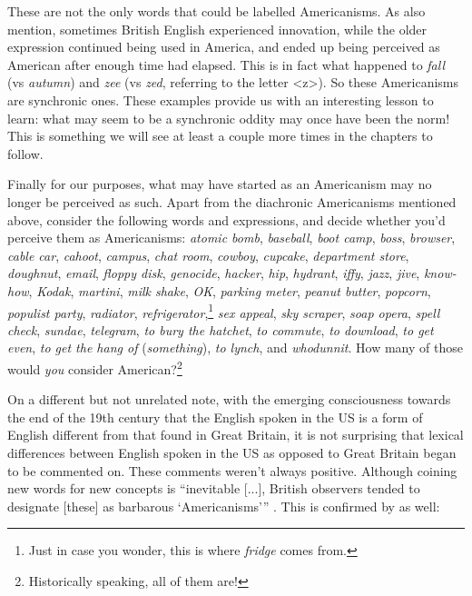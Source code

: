 These are not the only words that could be labelled Americanisms. As \citet{CassidyHall2001} also mention, sometimes British English experienced innovation, while the older expression continued being used in America, and ended up being perceived as American after enough time had elapsed. This is in fact what happened to \textit{fall} (vs \textit{autumn}) and \textit{zee} (vs \textit{zed}, referring to the letter <z>). So these Americanisms are synchronic ones. These examples provide us with an interesting lesson to learn: what may seem to be a synchronic oddity may once have been the norm! This is something we will see at least a couple more times in the chapters to follow. 

Finally for our purposes, what may have started as an Americanism may no longer be perceived as such. Apart from the diachronic Americanisms mentioned above, consider the following words and expressions, and decide whether you'd perceive them as Americanisms: \textit{atomic bomb}, \textit{baseball},  \textit{boot camp}, \textit{boss}, \textit{browser}, \textit{cable car}, \textit{cahoot}, \textit{campus}, \textit{chat room}, \textit{cowboy}, \textit{cupcake}, \textit{department store}, \textit{doughnut}, \textit{email}, \textit{floppy disk}, \textit{genocide}, \textit{hacker}, \textit{hip}, \textit{hydrant}, \textit{iffy}, \textit{jazz}, \textit{jive}, \textit{know-how}, \textit{Kodak}, \textit{martini}, \textit{milk shake}, \textit{OK}, \textit{parking meter}, \textit{peanut butter}, \textit{popcorn}, \textit{populist party}, \textit{radiator}, \textit{refrigerator},\footnote{Just in case you wonder, this is where \textit{fridge} comes from.} \textit{sex appeal}, \textit{sky scraper}, \textit{soap opera}, \textit{spell check}, \textit{sundae}, \textit{telegram}, \textit{to bury the hatchet}, \textit{to commute}, \textit{to download}, \textit{to get even}, \textit{to get the hang of} (\textit{something}), \textit{to lynch}, and \textit{whodunnit}. How many of those would \textit{you} consider American?\footnote{Historically speaking, all of them are!}

On a different but not unrelated note, with the emerging consciousness towards the end of the 19th century that the English spoken in the US is a form of English different from that found in Great Britain, it is not surprising that lexical differences between English spoken in the US as opposed to Great Britain began to be commented on. These comments weren't always positive. Although coining new words for new concepts is ``inevitable [...], British observers tended to designate [these] as barbarous `Americanisms'{''} \citep[68]{Fisher2001}. This is confirmed by \citet[185]{CassidyHall2001} as well:

